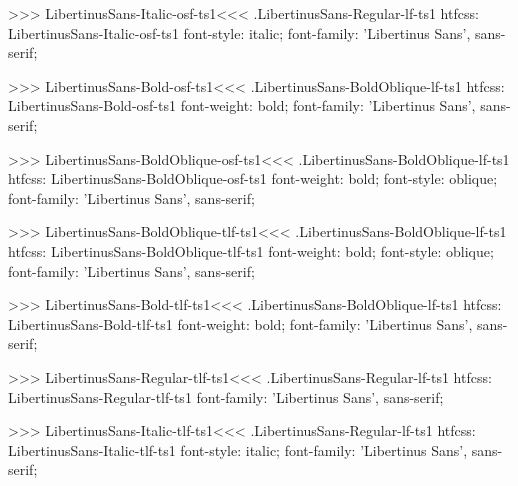 {{{{>>>
\<LibertinusSans-Italic-osf-ts1\><<<
.LibertinusSans-Regular-lf-ts1
htfcss:  LibertinusSans-Italic-osf-ts1  font-style: italic; font-family: 'Libertinus Sans', sans-serif;

>>>
\<LibertinusSans-Bold-osf-ts1\><<<
.LibertinusSans-BoldOblique-lf-ts1
htfcss:  LibertinusSans-Bold-osf-ts1  font-weight: bold; font-family: 'Libertinus Sans', sans-serif;

>>>
\<LibertinusSans-BoldOblique-osf-ts1\><<<
.LibertinusSans-BoldOblique-lf-ts1
htfcss:  LibertinusSans-BoldOblique-osf-ts1  font-weight: bold; font-style: oblique; font-family: 'Libertinus Sans', sans-serif;

>>>
\<LibertinusSans-BoldOblique-tlf-ts1\><<<
.LibertinusSans-BoldOblique-lf-ts1
htfcss:  LibertinusSans-BoldOblique-tlf-ts1  font-weight: bold; font-style: oblique; font-family: 'Libertinus Sans', sans-serif;

>>>
\<LibertinusSans-Bold-tlf-ts1\><<<
.LibertinusSans-BoldOblique-lf-ts1
htfcss:  LibertinusSans-Bold-tlf-ts1  font-weight: bold; font-family: 'Libertinus Sans', sans-serif;

>>>
\<LibertinusSans-Regular-tlf-ts1\><<<
.LibertinusSans-Regular-lf-ts1
htfcss:  LibertinusSans-Regular-tlf-ts1  font-family: 'Libertinus Sans', sans-serif;

>>>
\<LibertinusSans-Italic-tlf-ts1\><<<
.LibertinusSans-Regular-lf-ts1
htfcss:  LibertinusSans-Italic-tlf-ts1  font-style: italic; font-family: 'Libertinus Sans', sans-serif;

}}}}
